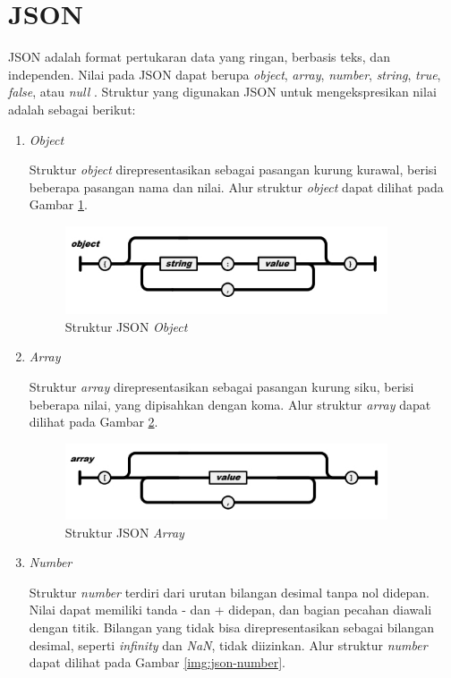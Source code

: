 \section{JSON}
\par JSON adalah format pertukaran data yang ringan, berbasis teks, dan independen. Nilai pada JSON dapat berupa \textit{object}, \textit{array}, \textit{number}, \textit{string}, \textit{true}, \textit{false}, atau \textit{null} \cite{json-online}. Struktur yang digunakan JSON untuk mengekspresikan nilai adalah sebagai berikut:
\begin{enumerate}[listparindent=2.5em]
	\item \textit{Object}
	\par Struktur \textit{object} direpresentasikan sebagai pasangan kurung kurawal, berisi beberapa pasangan nama dan nilai. Alur struktur \textit{object} dapat dilihat pada Gambar \ref{img:json-object}.
	\begin{figure}[H]
		\centering\includegraphics[width=0.9\textwidth]{bab2/img/json_object.jpg}
		\caption{Struktur JSON \textit{Object}} \label{img:json-object}
	\end{figure}
	\item \textit{Array}
	\par Struktur \textit{array} direpresentasikan sebagai pasangan kurung siku, berisi beberapa nilai, yang dipisahkan dengan koma. Alur struktur \textit{array} dapat dilihat pada Gambar \ref{img:json-array}.
	\begin{figure}[H]
		\centering\includegraphics[width=0.9\textwidth]{bab2/img/json_array.jpg}
		\caption{Struktur JSON \textit{Array}} \label{img:json-array}
	\end{figure}
	\item \textit{Number}
	\par Struktur \textit{number} terdiri dari urutan bilangan desimal tanpa nol didepan. Nilai dapat memiliki tanda - dan + didepan, dan bagian pecahan diawali dengan titik. Bilangan yang tidak bisa direpresentasikan sebagai bilangan desimal, seperti \textit{infinity} dan \textit{NaN}, tidak diizinkan. Alur struktur \textit{number} dapat dilihat pada Gambar \ref{img:json-number}.

\end{enumerate}
